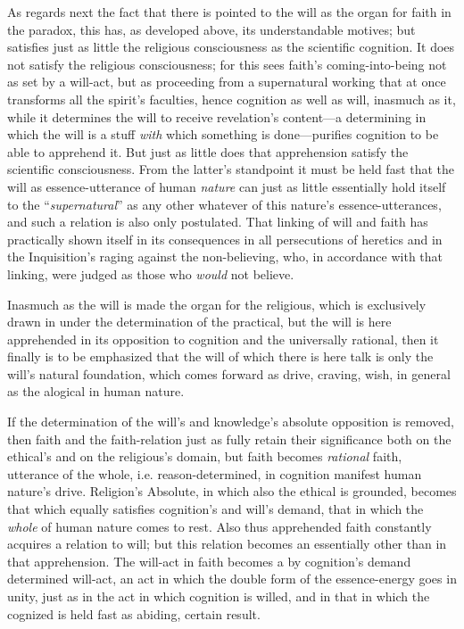 \documentclass[12pt,a4paper]{book}
\begin{document}
As regards next the fact that there is pointed to the will as the organ for faith in the paradox, this has, as
developed above, its understandable motives; but satisfies just as little the religious consciousness as the
scientific cognition. It does not satisfy the religious consciousness; for this sees faith's coming-into-being not
as set by a will-act, but as proceeding from a supernatural working that at once transforms all the spirit's
faculties, hence cognition as well as will, inasmuch as it, while it determines the will to receive revelation's
content---a determining in which the will is a stuff \emph{with} which something is done---purifies cognition to be able
to apprehend it. But just as little does that apprehension satisfy the scientific consciousness. From the latter's
standpoint it must be held fast that the will as essence-utterance of human \emph{nature} can just as little essentially
hold itself to the ``\emph{supernatural}'' as any other whatever of this nature's essence-utterances, and such a relation
is also only postulated. That linking of will and faith has practically shown itself in its consequences in all
persecutions of heretics and in the Inquisition's raging against the non-believing, who, in accordance with
that linking, were judged as those who \emph{would} not believe.

Inasmuch as the will is made the organ for the religious, which is exclusively drawn in under the determination of
the practical, but the will is here apprehended in its opposition to cognition and the universally rational, then
it finally is to be emphasized that the will of which there is here talk is only the will's natural foundation,
which comes forward as drive, craving, wish, in general as the alogical in human nature.

If the determination of the will's and knowledge's absolute opposition is removed, then faith and the
faith-relation just as fully retain their significance both on the ethical's and on the religious's domain, but
faith becomes \emph{rational} faith, utterance of the whole, i.e. reason-determined, in cognition manifest human
nature's drive. Religion's Absolute, in which also the ethical is grounded, becomes that which equally satisfies
cognition's and will's demand, that in which the \emph{whole} of human nature comes to rest. Also thus apprehended
faith constantly acquires a relation to will; but this relation becomes an essentially other than in that
apprehension. The will-act in faith becomes a by cognition's demand determined will-act, an act in which the double
form of the essence-energy goes in unity, just as in the act in which cognition is willed, and in that in which the
cognized is held fast as abiding, certain result.
\end{document}
